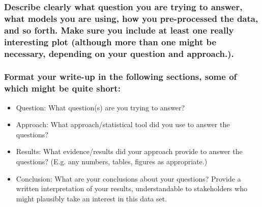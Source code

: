 \documentclass[
  12pt,
]{article}
\begin{document}
\hypertarget{describe-clearly-what-question-you-are-trying-to-answer-what-models-you-are-using-how-you-pre-processed-the-data-and-so-forth.-make-sure-you-include-at-least-one-really-interesting-plot-although-more-than-one-might-be-necessary-depending-on-your-question-and-approach..}{%
\subsubsection{Describe clearly what question you are trying to answer,
what models you are using, how you pre-processed the data, and so forth.
Make sure you include at least one really interesting plot (although
more than one might be necessary, depending on your question and
approach.).}\label{describe-clearly-what-question-you-are-trying-to-answer-what-models-you-are-using-how-you-pre-processed-the-data-and-so-forth.-make-sure-you-include-at-least-one-really-interesting-plot-although-more-than-one-might-be-necessary-depending-on-your-question-and-approach..}}

\hypertarget{format-your-write-up-in-the-following-sections-some-of-which-might-be-quite-short}{%
\subsubsection{Format your write-up in the following sections, some of
which might be quite
short:}\label{format-your-write-up-in-the-following-sections-some-of-which-might-be-quite-short}}

\begin{itemize}
\item
  Question: What question(s) are you trying to answer?
\item
  Approach: What approach/statistical tool did you use to answer the
  questions?
\item
  Results: What evidence/results did your approach provide to answer the
  questions? (E.g. any numbers, tables, figures as appropriate.)
\item
  Conclusion: What are your conclusions about your questions? Provide a
  written interpretation of your results, understandable to stakeholders
  who might plausibly take an interest in this data set.
\end{itemize}
\end{document}

